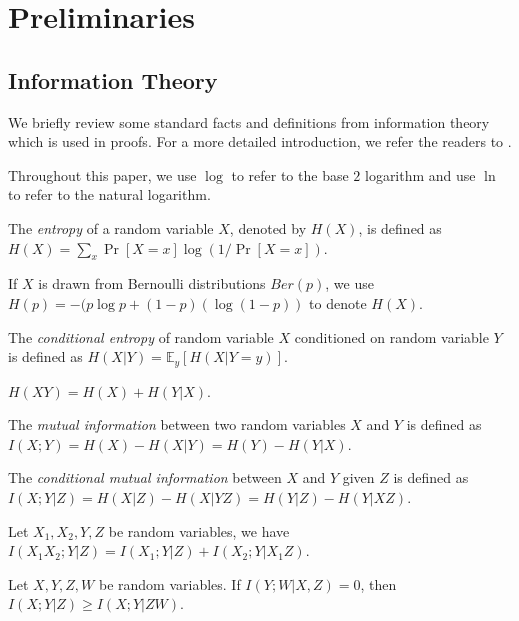 \section{Preliminaries}
\subsection{Information Theory}
We briefly review some standard facts and definitions from information theory which is used in proofs. For a more detailed introduction, we refer the readers to \cite{CK11}.

Throughout this paper, we use $\log$ to refer to the base $2$ logarithm and use $\ln$ to refer to the natural logarithm.

\begin{definition}
The \emph{entropy} of a random variable $X$, denoted by $H(X)$, is defined as $H(X) = \sum_x \Pr[X = x] \log(1 / \Pr[X = x])$. 
\end{definition}

If $X$ is drawn from Bernoulli distributions $Ber(p)$, we use $H(p) = -(p\log p + (1-p)(\log(1-p))$ to denote $H(X)$. 

\begin{definition}
The \emph{conditional entropy} of random variable $X$ conditioned on random variable $Y$ is defined as $H(X|Y) = \mathbb{E}_y[H(X|Y = y)]$. 
\end{definition}

\begin{fact}
$H(XY) = H(X) + H(Y|X)$. 
\end{fact}

\begin{definition}
\label{def:muinfo}
The \emph{mutual information} between two random variables $X$ and $Y$ is defined as $I(X;Y) = H(X) - H(X|Y) = H(Y) - H(Y|X)$. 
\end{definition}

\begin{definition}
The \emph{conditional mutual information} between $X$ and $Y$ given $Z$ is defined as $I(X;Y|Z) = H(X|Z) - H(X|YZ) = H(Y|Z) - H(Y|XZ)$. 
\end{definition}

\begin{fact}\label{fact:cr}
Let $X_1,X_2,Y,Z$ be random variables, we have $I(X_1X_2;Y|Z) = I(X_1;Y|Z) + I(X_2;Y|X_1Z)$.
\end{fact}

\begin{fact}
\label{fact:it1}
Let $X,Y,Z,W$ be random variables. If $I(Y;W|X,Z) = 0$, then $I(X;Y|Z) \geq I(X;Y|ZW)$. 
\end{fact}


